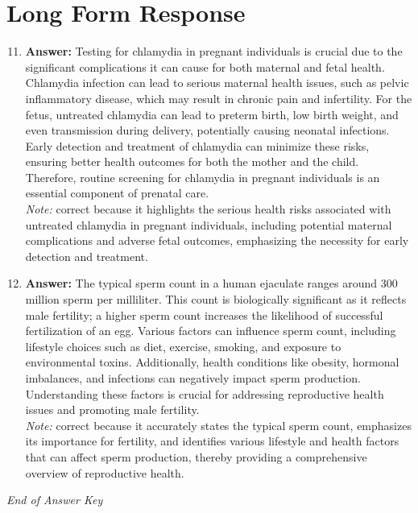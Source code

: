 \documentclass[12pt]{article}
\begin{document}
\section*{Long Form Response}
\begin{enumerate}[label=\arabic*.]
\setcounter{enumi}{10}
\item \textbf{Answer:} Testing for chlamydia in pregnant individuals is crucial due to the significant complications it can cause for both maternal and fetal health. Chlamydia infection can lead to serious maternal health issues, such as pelvic inflammatory disease, which may result in chronic pain and infertility. For the fetus, untreated chlamydia can lead to preterm birth, low birth weight, and even transmission during delivery, potentially causing neonatal infections. Early detection and treatment of chlamydia can minimize these risks, ensuring better health outcomes for both the mother and the child. Therefore, routine screening for chlamydia in pregnant individuals is an essential component of prenatal care.
\\ \textit{Note:} correct because it highlights the serious health risks associated with untreated chlamydia in pregnant individuals, including potential maternal complications and adverse fetal outcomes, emphasizing the necessity for early detection and treatment.
\item \textbf{Answer:} The typical sperm count in a human ejaculate ranges around 300 million sperm per milliliter. This count is biologically significant as it reflects male fertility; a higher sperm count increases the likelihood of successful fertilization of an egg. Various factors can influence sperm count, including lifestyle choices such as diet, exercise, smoking, and exposure to environmental toxins. Additionally, health conditions like obesity, hormonal imbalances, and infections can negatively impact sperm production. Understanding these factors is crucial for addressing reproductive health issues and promoting male fertility.
\\ \textit{Note:} correct because it accurately states the typical sperm count, emphasizes its importance for fertility, and identifies various lifestyle and health factors that can affect sperm production, thereby providing a comprehensive overview of reproductive health.
\end{enumerate}

\vfill
\noindent\textit{End of Answer Key}
\end{document}
